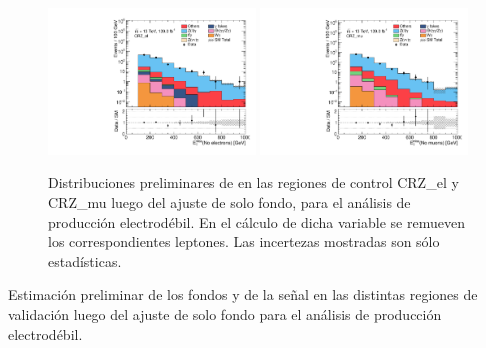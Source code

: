 \begin{figure}[ht!]

\centering
    \includegraphics[width=0.49\textwidth]{images/analysis_EWK/v192_2_nosyst/can_CRZ_el_met_noele_et_afterFit.pdf}
    \includegraphics[width=0.49\textwidth]{images/analysis_EWK/v192_2_nosyst/can_CRZ_mu_met_nomuon_et_afterFit.pdf}

    \caption{Distribuciones preliminares de \met en las regiones de control CRZ\_el y CRZ\_mu luego del ajuste de solo fondo, para el análisis de producción electrodébil. En el cálculo de dicha variable se remueven los correspondientes leptones. Las incertezas mostradas son sólo estadísticas.}
    \label{fig:crz_el_mu_dist_ewk}
\end{figure}




\begin{table}[ht!]
  \centering
  \caption{Estimación preliminar de los fondos y de la señal en las distintas regiones de validación luego del ajuste de solo fondo para el análisis de producción electrodébil.}
  \resizebox{\textwidth}{!}{}
  \label{tab:fit_result_vr}
\end{table}


